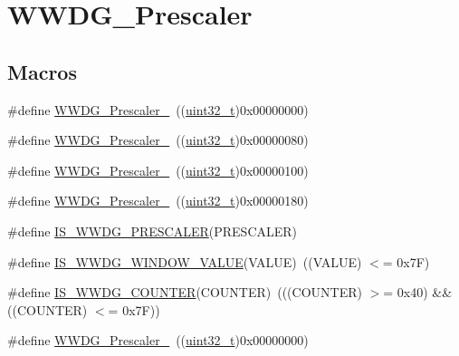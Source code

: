 \hypertarget{group___w_w_d_g___prescaler}{}\section{W\+W\+D\+G\+\_\+\+Prescaler}
\label{group___w_w_d_g___prescaler}
\subsection*{Macros}
\begin{DoxyCompactItemize}
\item 
\#define \hyperlink{group___w_w_d_g___prescaler_ga55780dcf60a252724f5aae2ca37d91c5}{W\+W\+D\+G\+\_\+\+Prescaler\+\_}~((\hyperlink{_p_e___types_8h_a33594304e786b158f3fb30289278f5af}{uint32\+\_\+t})0x00000000)
\item 
\#define \hyperlink{group___w_w_d_g___prescaler_ga2ac67d0a7f8691b5ebf0d7d77d6b5f08}{W\+W\+D\+G\+\_\+\+Prescaler\+\_}~((\hyperlink{_p_e___types_8h_a33594304e786b158f3fb30289278f5af}{uint32\+\_\+t})0x00000080)
\item 
\#define \hyperlink{group___w_w_d_g___prescaler_gab11714e1816967802a8421587e54a2eb}{W\+W\+D\+G\+\_\+\+Prescaler\+\_}~((\hyperlink{_p_e___types_8h_a33594304e786b158f3fb30289278f5af}{uint32\+\_\+t})0x00000100)
\item 
\#define \hyperlink{group___w_w_d_g___prescaler_ga7a4933366603869726bd5ea547d99f02}{W\+W\+D\+G\+\_\+\+Prescaler\+\_}~((\hyperlink{_p_e___types_8h_a33594304e786b158f3fb30289278f5af}{uint32\+\_\+t})0x00000180)
\item 
\#define \hyperlink{group___w_w_d_g___prescaler_ga39070de0722a70f99a6fcfe8720b2dfd}{I\+S\+\_\+\+W\+W\+D\+G\+\_\+\+P\+R\+E\+S\+C\+A\+L\+ER}(P\+R\+E\+S\+C\+A\+L\+ER)
\item 
\#define \hyperlink{group___w_w_d_g___prescaler_gab6ea714a2380b7d6547ba97363887868}{I\+S\+\_\+\+W\+W\+D\+G\+\_\+\+W\+I\+N\+D\+O\+W\+\_\+\+V\+A\+L\+UE}(V\+A\+L\+UE)~((V\+A\+L\+UE) $<$= 0x7\+F)
\item 
\#define \hyperlink{group___w_w_d_g___prescaler_ga4728877128cd60494692d8f14389112e}{I\+S\+\_\+\+W\+W\+D\+G\+\_\+\+C\+O\+U\+N\+T\+ER}(C\+O\+U\+N\+T\+ER)~(((C\+O\+U\+N\+T\+ER) $>$= 0x40) \&\& ((\+C\+O\+U\+N\+T\+E\+R) $<$= 0x7\+F))
\item 
\#define \hyperlink{group___w_w_d_g___prescaler_ga55780dcf60a252724f5aae2ca37d91c5}{W\+W\+D\+G\+\_\+\+Prescaler\+\_}~((\hyperlink{_p_e___types_8h_a33594304e786b158f3fb30289278f5af}{uint32\+\_\+t})0x00000000)

\end{DoxyCompactItemize}
